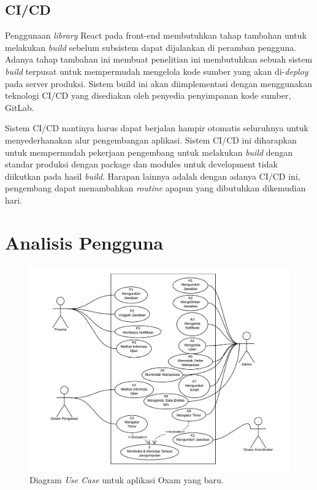 \subsection{CI/CD}
    Penggunaan \textit{library} React pada front-end membutuhkan tahap tambahan
    untuk melakukan \textit{build} sebelum subsistem dapat dijalankan di
    peramban pengguna. Adanya tahap tambahan ini membuat penelitian ini
    membutuhkan sebuah sistem \textit{build} terpusat untuk mempermudah
    mengelola kode sumber yang akan di-\textit{deploy} pada server produksi.
    Sistem build ini akan diimplementasi dengan menggunakan teknologi CI/CD yang
    disediakan oleh penyedia penyimpanan kode sumber, GitLab.
    
    Sistem CI/CD nantinya harus dapat berjalan hampir otomatis seluruhnya untuk
    menyederhanakan alur pengembangan aplikasi. Sistem CI/CD ini diharapkan
    untuk mempermudah pekerjaan pengembang untuk melakukan \textit{build} dengan
    standar produksi dengan package dan modules untuk development tidak
    diikutkan pada hasil \textit{build}. Harapan lainnya adalah dengan adanya
    CI/CD ini, pengembang dapat menambahkan \textit{routine} apapun yang
    dibutuhkan dikemudian hari.

\section{Analisis Pengguna}
\begin{figure}
    \centering
    \includegraphics[width=0.75\paperwidth]{Gambar/UseCase - RevB.pdf}
    \caption{Diagram \textit{Use Case} untuk aplikasi Oxam yang baru.}
    \label{fig:diagram_usecase}
\end{figure}


